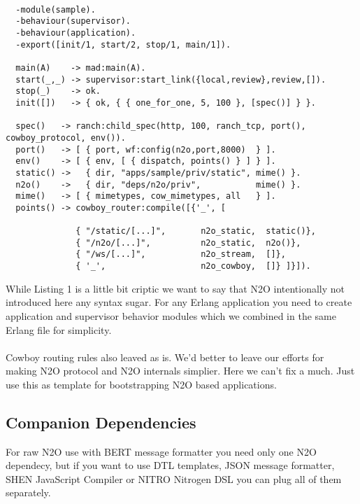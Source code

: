 \vspace{1\baselineskip}
\begin{lstlisting}[caption=sample.erl]

  -module(sample).
  -behaviour(supervisor).
  -behaviour(application).
  -export([init/1, start/2, stop/1, main/1]).

  main(A)    -> mad:main(A).
  start(_,_) -> supervisor:start_link({local,review},review,[]).
  stop(_)    -> ok.
  init([])   -> { ok, { { one_for_one, 5, 100 }, [spec()] } }.

  spec()   -> ranch:child_spec(http, 100, ranch_tcp, port(), cowboy_protocol, env()).
  port()   -> [ { port, wf:config(n2o,port,8000)  } ].
  env()    -> [ { env, [ { dispatch, points() } ] } ].
  static() ->   { dir, "apps/sample/priv/static", mime() }.
  n2o()    ->   { dir, "deps/n2o/priv",           mime() }.
  mime()   -> [ { mimetypes, cow_mimetypes, all   } ].
  points() -> cowboy_router:compile([{'_', [

              { "/static/[...]",       n2o_static,  static()},
              { "/n2o/[...]",          n2o_static,  n2o()},
              { "/ws/[...]",           n2o_stream,  []},
              { '_',                   n2o_cowboy,  []} ]}]).
\end{lstlisting}
\vspace{1\baselineskip}

\newpage
While Listing 1 is a little bit criptic we want to say that N2O
intentionally not introduced here any syntax sugar.
For any Erlang application you need to create application
and supervisor behavior modules which we combined in the
same Erlang file for simplicity.

\paragraph{}
Cowboy routing rules also leaved as is.
We'd better to leave our efforts for making N2O protocol
and N2O internals simplier. Here we can't fix a much. Just use this
as template for bootstrapping N2O based applications.

\subsection{Companion Dependencies}
For raw N2O use with BERT message formatter you need only
one N2O dependecy, but if you want to use DTL templates,
JSON message formatter, SHEN JavaScript Compiler or NITRO
Nitrogen DSL you can plug all of them separately.

